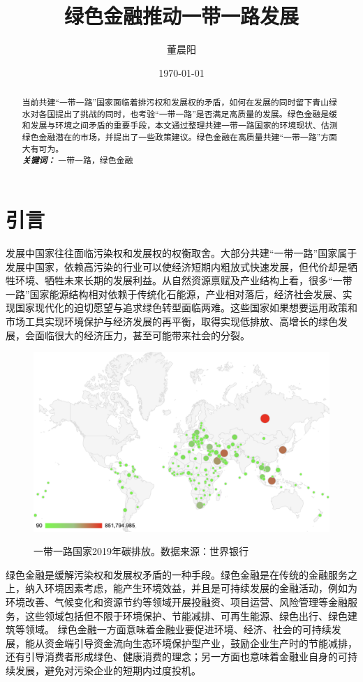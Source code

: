 \documentclass[a4paper,12pt]{ctexart}
\title{绿色金融推动一带一路发展}
\author{董晨阳}
\date{\today}
\providecommand{\keywords}[1]{\\\textbf{\textit{关键词：}} #1}
\begin{document}
\maketitle
\begin{abstract}
    当前共建“一带一路”国家面临着排污权和发展权的矛盾，如何在发展的同时留下青山绿水对各国提出了挑战的同时，也考验“一带一路”是否满足高质量的发展。绿色金融是缓和发展与环境之间矛盾的重要手段，本文通过整理共建一带一路国家的环境现状、估测绿色金融潜在的市场，并提出了一些政策建议。绿色金融在高质量共建“一带一路”方面大有可为。
\keywords{一带一路，绿色金融}
\end{abstract}
\clearpage
\section*{引言}

发展中国家往往面临污染权和发展权的权衡取舍\cite{曾文革2012从碳排放权之争看我国在气候变化上的法律应对}。大部分共建“一带一路”国家属于发展中国家，依赖高污染的行业可以使经济短期内粗放式快速发展，但代价却是牺牲环境、牺牲未来长期的发展利益。从自然资源禀赋及产业结构上看，很多“一带一路”国家能源结构相对依赖于传统化石能源，产业相对落后，经济社会发展、实现国家现代化的迫切愿望与追求绿色转型面临两难。这些国家如果想要运用政策和市场工具实现环境保护与经济发展的再平衡，取得实现低排放、高增长的绿色发展，会面临很大的经济压力，甚至可能带来社会的分裂。
\begin{figure}[H]
    \centering
    \includegraphics[width=0.8\linewidth]{./img/碳排放.png}
    \label{fig:carbonemit}
    \caption{一带一路国家2019年碳排放。数据来源：世界银行}
\end{figure}

绿色金融是缓解污染权和发展权矛盾的一种手段。绿色金融是在传统的金融服务之上，纳入环境因素考虑，能产生环境效益，并且是可持续发展的金融活动，例如为环境改善、气候变化和资源节约等领域开展投融资、项目运营、风险管理等金融服务，这些领域包括但不限于环境保护、节能减排、可再生能源、绿色出行、绿色建筑等领域。
绿色金融一方面意味着金融业要促进环境、经济、社会的可持续发展，能从资金端引导资金流向生态环境保护型产业，鼓励企业生产时的节能减排，还有引导消费者形成绿色、健康消费的理念；另一方面也意味着金融业自身的可持续发展，避免对污染企业的短期内过度投机。
\end{document}
